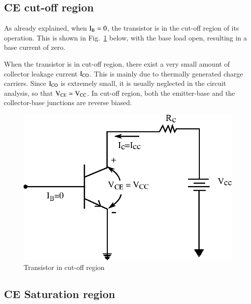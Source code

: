 \subsection{CE cut-off region}\label{sec2.5.1}

As already explained, when $\textrm{I}_{\textrm{B}}=0$, the transistor is in the cut-off region of its operation. This is shown in Fig.~\ref{fig2.17} below, with the base load open, resulting in a base current of zero.

\smallskip
When the transistor is in cut-off region, there exist a very small amount of collector leakage current $\textrm{I}_{\text{CO}}$. This is mainly due to thermally generated charge carriers. Since $\textrm{I}_{\text{CO}}$ is extremely small, it is usually neglected in the circuit analysis, so that $\textrm{V}_{\text{CE}}\simeq \textrm{V}_{\text{CC}}$. In cut-off region, both the emitter-base and the collector-base junctions are reverse biased.
\begin{figure}[H]
\centering
\includegraphics{chap2/fig17.eps}
\smallskip
\caption{Transistor in cut-off region}\label{fig2.17}
\end{figure}

\smallskip
\subsection{CE Saturation region}\label{sec2.5.2}

